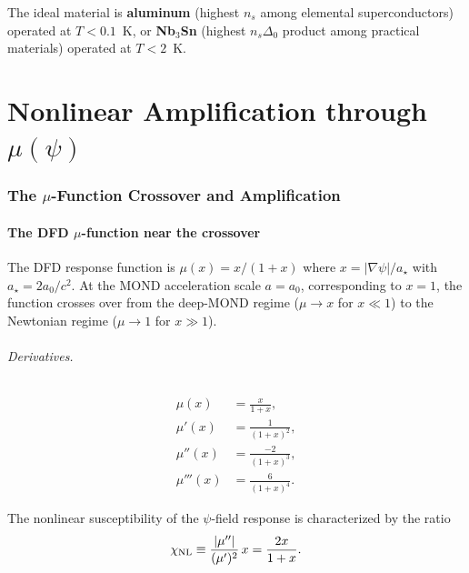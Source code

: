 \documentclass[12pt,aps,prd,twocolumn,superscriptaddress,nofootinbib]{revtex4-2}
\newcommand{\astar}{a_\star}
\newcommand{\azero}{a_0}
\begin{document}
The ideal material is \textbf{aluminum} (highest $n_s$ among elemental
superconductors) operated at $T < 0.1$~K, or \textbf{Nb$_3$Sn}
(highest $n_s\Delta_0$ product among practical materials) operated at
$T < 2$~K.


\part{Nonlinear Amplification through $\mu(\psi)$}

\section{The $\mu$-Function Crossover and Amplification}
\label{sec:mu-amplification}

\subsection{The DFD $\mu$-function near the crossover}

The DFD response function is $\mu(x) = x/(1+x)$ where
$x = |\nabla\psi|/\astar$ with $\astar = 2\azero/c^2$.
At the MOND acceleration scale $a = \azero$, corresponding to
$x = 1$, the function crosses over from the deep-MOND regime
($\mu \to x$ for $x \ll 1$) to the Newtonian regime
($\mu \to 1$ for $x \gg 1$).

\paragraph{Derivatives.}
\begin{align}
\mu(x) &= \frac{x}{1+x}, \label{eq:mu} \\
\mu'(x) &= \frac{1}{(1+x)^2}, \label{eq:mu-prime} \\
\mu''(x) &= \frac{-2}{(1+x)^3}, \label{eq:mu-double-prime} \\
\mu'''(x) &= \frac{6}{(1+x)^4}. \label{eq:mu-triple-prime}
\end{align}

The nonlinear susceptibility of the $\psi$-field response is
characterized by the ratio
\begin{equation}\label{eq:chi-NL}
\chi_{\rm NL} \equiv \frac{|\mu''|}{(\mu')^2}\,x
= \frac{2x}{1+x}.
\end{equation}
\end{document}
